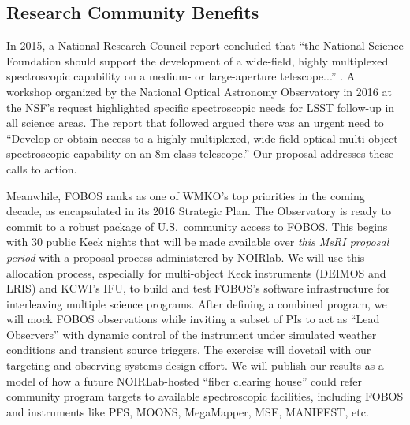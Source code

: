 \documentclass[oneside,11pt]{amsart}
\begin{document}

\subsection{Research Community Benefits}
\label{sec:community}

In 2015, a National Research Council report concluded that ``the National Science
Foundation should support the development of a wide-field, highly multiplexed spectroscopic capability on a medium- or
large-aperture telescope...'' \citep{NAP21722}.  A workshop organized by the National Optical Astronomy Observatory in
2016 at the NSF's request highlighted specific spectroscopic needs for LSST follow-up in all science areas.  The report
that followed argued there was an urgent need to ``Develop or obtain access to a highly multiplexed, wide-field optical
multi-object spectroscopic capability on an 8m-class telescope.''  Our proposal addresses these calls to action.

Meanwhile, FOBOS ranks as one of WMKO’s top priorities in the coming decade, as encapsulated in its 2016 Strategic
Plan.  The Observatory is ready to commit to a robust package of U.S.\ community access to FOBOS.  This begins with 
 30 public Keck nights that will be made available over \emph{this MsRI proposal
period} with a proposal process administered by NOIRlab.  We will use this allocation process, especially for multi-object Keck instruments (DEIMOS and LRIS) and KCWI's IFU, to build and test FOBOS's software infrastructure for interleaving multiple science programs.  After defining a combined program, we will mock FOBOS observations while inviting a subset of PIs to act as ``Lead Observers'' with dynamic control of the instrument under simulated weather conditions and transient source triggers.  The exercise will dovetail with our targeting and observing systems design effort.  We will publish our results as a model of how a future NOIRLab-hosted ``fiber clearing house'' could refer community program targets to available spectroscopic facilities, including FOBOS and instruments like PFS, MOONS, MegaMapper, MSE, MANIFEST, etc.

\end{document}
